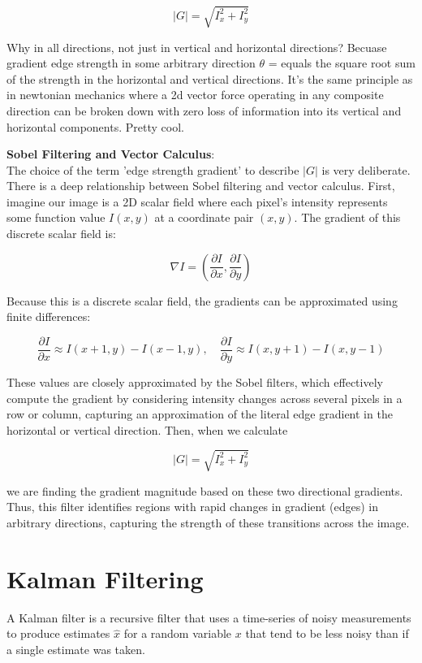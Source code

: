 \documentclass[12pt]{article}
\begin{document}
\[|G| = \sqrt{I_x^2 + I_y^2}\]

Why in all directions, not just in vertical and horizontal directions? Becuase gradient edge strength in some arbitrary direction \(\theta\) = equals the square root sum of the strength in the horizontal and vertical directions. It's the same principle as in newtonian mechanics where a 2d vector force operating in any composite direction can be broken down with zero loss of information into its vertical and horizontal components. Pretty cool. 

\textbf{Sobel Filtering and Vector Calculus}: \\

The choice of the term 'edge strength gradient' to describe \(|G|\) is very deliberate. There is a deep relationship between Sobel filtering and vector calculus. First, imagine our image is a 2D scalar field where each pixel's intensity represents some function value \(I(x, y)\) at a coordinate pair \((x, y)\). The gradient of this discrete scalar field is:

\[
\nabla I = \left( \frac{\partial I}{\partial x}, \frac{\partial I}{\partial y} \right)
\]

Because this is a discrete scalar field, the gradients can be approximated using finite differences:

\[
\frac{\partial I}{\partial x} \approx I(x+1, y) - I(x-1, y), \quad \frac{\partial I}{\partial y} \approx I(x, y+1) - I(x, y-1)
\]

These values are closely approximated by the Sobel filters, which effectively compute the gradient by considering intensity changes across several pixels in a row or column, capturing an approximation of the literal edge gradient in the horizontal or vertical direction. Then, when we calculate

\[
|G| = \sqrt{I_x^2 + I_y^2}
\]

we are finding the gradient magnitude based on these two directional gradients. Thus, this filter identifies regions with rapid changes in gradient (edges) in arbitrary directions, capturing the strength of these transitions across the image.
\section{Kalman Filtering}
A Kalman filter is a recursive filter that uses a time-series of noisy measurements to produce estimates \(\hat{x}\) for a random variable \(x\) that tend to be less noisy than if a single estimate was taken. \\
\end{document}
